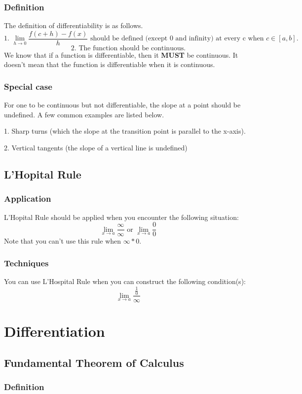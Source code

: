 \documentclass{article}
\begin{document}
\subsubsection{Definition}
The definition of differentiability is as follows.
$$
\text{1. }\lim_{h \to 0} \frac{f(c+h)-f(x)}{h} \text{ should be defined (except 0 and infinity) at every c when }c \in [a,b]\text{.}
$$
$$
\text{2. The function should be continuous.}
$$
We know that if a function is differentiable, then it \textbf{MUST} be continuous. It doesn't mean that the function is differentiable when it is continuous.
\subsubsection{Special case}
For one to be continuous but not differentiable, the slope at a point should be undefined. A few common examples are listed below.


1. Sharp turns (which the slope at the transition point is parallel to the x-axis).


2. Vertical tangents (the slope of a vertical line is undefined)

\subsection{L'Hopital Rule}
\subsubsection{Application}
L'Hopital Rule should be applied when you encounter the following situation:
\begin{equation*}
  \lim_{x \to a} \frac{\infty} {\infty} \text{ or } \lim_{x \to a} \frac{0}{0}
\end{equation*}
Note that you can't use this rule when $\infty * 0$.
\subsubsection{Techniques}
You can use L'Hospital Rule when you can construct the following condition(s):
$$
\lim_{x \to a} \frac{\frac{1}{0}} {\infty}
$$
\section{Differentiation}
\subsection{Fundamental Theorem of Calculus}
\subsubsection{Definition}
\end{document}
